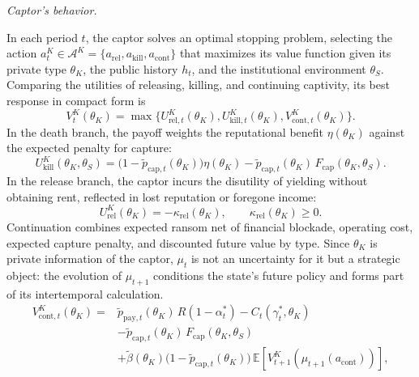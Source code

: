 \documentclass[ecta,nameyear,draft]{econsocart}
\theoremstyle{plain}
\theoremstyle{definition}
\newcommand{\E}{\mathbb{E}}
\newcommand{\1}{\mathbf{1}}
\begin{document}
\noindent\textit{Captor's behavior.}

\noindent In each period $t$, the captor solves an optimal stopping problem, selecting the action $a_t^K\in\mathcal{A}^K=\{a_{\mathrm{rel}},a_{\mathrm{kill}},a_{\mathrm{cont}}\}$ that maximizes its value function given its private type $\theta_K$, the public history $h_t$, and the institutional environment $\theta_S$. Comparing the utilities of releasing, killing, and continuing captivity, its best response in compact form is
\begin{equation}
V^K_t(\theta_K)=
\max\{U^K_{\mathrm{rel},t}(\theta_K),
U^K_{\mathrm{kill},t}(\theta_K),
V^K_{\mathrm{cont},t}(\theta_K)\}.
\label{eq:k-bellman}
\end{equation}
In the death branch, the payoff weights the reputational benefit $\eta(\theta_K)$ against the expected penalty for capture:
\begin{equation}
U^K_{\mathrm{kill}}(\theta_K,\theta_S)=\bigl(1-\tilde{p}_{\mathrm{cap},t}(\theta_K)\bigr)\eta(\theta_K)-\tilde{p}_{\mathrm{cap},t}(\theta_K)\,F_{\mathrm{cap}}(\theta_K,\theta_S).
\label{eq:k-kill}
\end{equation}
In the release branch, the captor incurs the disutility of yielding without obtaining rent, reflected in lost reputation or foregone income:
\begin{equation}
U^K_{\mathrm{rel}}(\theta_K)=-\kappa_{\mathrm{rel}}(\theta_K),\qquad\kappa_{\mathrm{rel}}(\theta_K)\ge 0.
\label{eq:k-rel}
\end{equation}
Continuation combines expected ransom net of financial blockade, operating cost, expected capture penalty, and discounted future value by type. Since $\theta_K$ is private information of the captor, $\mu_t$ is not an uncertainty for it but a strategic object: the evolution of $\mu_{t+1}$ conditions the state's future policy and forms part of its intertemporal calculation.
\begin{equation}
\begin{aligned}
V^K_{\mathrm{cont},t}(\theta_K)
={}&\tilde{p}_{\mathrm{pay},t}(\theta_K)\,R(1-\alpha_t^\ast)
-C_t(\gamma_t^\ast,\theta_K)\\
&-\tilde{p}_{\mathrm{cap},t}(\theta_K)\,F_{\mathrm{cap}}(\theta_K,\theta_S)\\
&+\tilde{\beta}(\theta_K)\bigl(1-\tilde{p}_{\mathrm{cap},t}(\theta_K)\bigr)\,\E\!\left[V^K_{t+1}\!\left(\mu_{t+1}(a_{\mathrm{cont}})\right)\right],
\end{aligned}
\label{eq:kidnapper-cont}
\end{equation}
\end{document}
